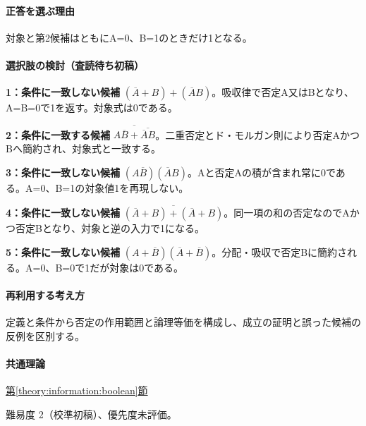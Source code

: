 \paragraph{正答を選ぶ理由} 対象と第2候補はともにA=\allowbreak{}0、B=\allowbreak{}1のときだけ1となる。

\paragraph{選択肢の検討（査読待ち初稿）}\mbox{}\par

\noindent\textbf{1：条件に一致しない候補} \((\overline A+B)+(\overline A B)\)。吸収律で否定A又はBとなり、A=\allowbreak{}B=\allowbreak{}0で1を返す。対象式は0である。\par

\noindent\textbf{2：条件に一致する候補} \(\overline{A\overline B+\overline{\overline A B}}\)。二重否定とド・モルガン則により否定AかつBへ簡約され、対象式と一致する。\par

\noindent\textbf{3：条件に一致しない候補} \((A\overline B)(\overline A B)\)。Aと否定Aの積が含まれ常に0である。A=\allowbreak{}0、B=\allowbreak{}1の対象値1を再現しない。\par

\noindent\textbf{4：条件に一致しない候補} \(\overline{(\overline A+B)+(\overline A+B)}\)。同一項の和の否定なのでAかつ否定Bとなり、対象と逆の入力で1になる。\par

\noindent\textbf{5：条件に一致しない候補} \((A+\overline B)(\overline A+\overline B)\)。分配・吸収で否定Bに簡約される。A=\allowbreak{}0、B=\allowbreak{}0で1だが対象は0である。\par

\paragraph{再利用する考え方} 定義と条件から否定の作用範囲と論理等価を構成し、成立の証明と誤った候補の反例を区別する。

\paragraph{共通理論} \hyperref[theory:information:boolean]{第\ref*{theory:information:boolean}節}

\par 難易度 2（校準初稿）、優先度未評価。

